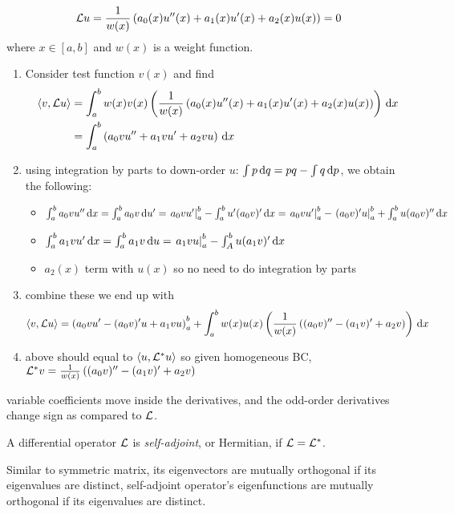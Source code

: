 \documentclass{article}
\begin{document}
\begin{example}
    \[\mathcal{L} u =\frac{1}{w(x)}\left( a_0(x)u''(x)+a_1(x)u'(x)+a_2(x)u(x) \right)=0\]
    where \(x\in [a,b]\) and \(w(x)\) is a weight function.
    \begin{enumerate}
        \item Consider test function \(v(x)\) and find
        \begin{equation*}
            \begin{split}
                \left \langle v,\mathcal{L} u \right \rangle&=\int_a^b w(x)v(x) \left( \frac{1}{w(x)}\left( a_0(x)u''(x)+a_1(x)u'(x)+a_2(x)u(x) \right) \right)\,\mathrm{d} x\\
                &= \int_a^b \left( a_0vu''+a_1 vu'+a_2vu \right)\,\mathrm{d} x
            \end{split}
        \end{equation*}
        \item using integration by parts to down-order \(u\): \(\int p\,\mathrm{d} q=pq-\int q\,\mathrm{d} p\), we obtain the following:
        \begin{itemize}
            \item \(\int_a^b a_0vu''\,\mathrm{d} x= \int_a^b a_0v\,\mathrm{d} u'= \left.a_0vu'\right|_a^b -\int_a^b u'(a_0v)'\,\mathrm{d} x =\left.a_0vu'\right|_a^b -\left.(a_0v)'u\right|_a^b +\int_a^b u(a_0v)''\,\mathrm{d} x \)
            \item \(\int_a^b a_1 vu'\,\mathrm{d} x = \int_a^b a_1 v\,\mathrm{d} u=\left.a_1vu\right|_a^b-\int_A^b u(a_1v)'\,\mathrm{d} x\)
            \item \(a_2(x)\) term with \(u(x)\) so no need to do integration by parts
        \end{itemize}
        \item combine these we end up with
        \[\left \langle v,\mathcal{L} u \right \rangle=\left( a_0 vu'-(a_0v)'u+a_1vu \right)_a^b +\int_a^b w(x)u(x)\left( \frac{1}{w(x)}\left( (a_0v)''-(a_1v)'+a_2v \right) \right)\,\mathrm{d} x \]
        \item above should equal to \(\left \langle u,\mathcal{L}^* u \right \rangle\) so given homogeneous BC, \(\mathcal{L}^*v=\frac{1}{w(x)}\left( (a_0v)''-(a_1v)'+a_2v \right)\)
    \end{enumerate}
\end{example}
\begin{remark}
    variable coefficients move inside the derivatives, and the odd-order derivatives change sign as compared to \(\mathcal{L}\).
\end{remark}

\begin{definition}
    A differential operator \(\mathcal{L}\) is {\it self-adjoint}, or Hermitian, if \(\mathcal{L}=\mathcal{L}^*\).
\end{definition}
\begin{remark}
    Similar to symmetric matrix, its eigenvectors are mutually orthogonal if its eigenvalues are distinct, self-adjoint operator's eigenfunctions are mutually orthogonal if its eigenvalues are distinct.
\end{remark}
\end{document}
